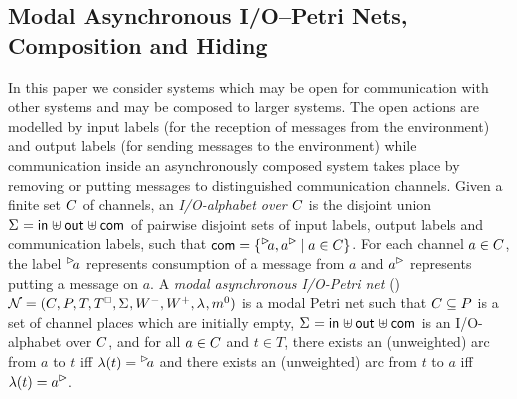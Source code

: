
\subsection{Modal Asynchronous I/O--Petri Nets, Composition and Hiding}\label{sec:MAIOPN}

In this paper we consider systems which may be open for communication with other systems and may be composed to larger systems.
The open actions are modelled by input labels (for the reception of messages from the environment) and output labels (for sending messages to the environment)
while communication inside an asynchronously composed system takes place by removing or putting messages to distinguished communication channels.
Given a finite set $C$ of channels, an \emph{I/O-alphabet over $C$} is the disjoint union $\Sigma_{} = \mathsf{in}_{} \uplus \mathsf{out}_{} \uplus \mathsf{com}_{}$ of pairwise disjoint sets of input labels, output labels and communication labels, such that $\com = \{\inact{a},\outact{a} \mid a \in \chan\}$.
For each channel $a \in C$, the label $\inact{a}$ represents consumption of a message from $a$ and $\outact{a}$ represents putting a message on $a$.
A \emph{modal asynchronous I/O-Petri net} (\MAIOPN) $\mathcal{N} = (C_{},\allowbreak P_{},\allowbreak T_{},\allowbreak T^{\scriptscriptstyle\square}_{}, \allowbreak \Sigma_{},\allowbreak W_{}^-,\allowbreak W_{}^+,\allowbreak \lambda_{},\allowbreak m^0_{})$ is a modal Petri net such that
$C \subseteq P$ is a set of channel places which are initially empty, $\Sigma_{} = \mathsf{in}_{} \uplus \mathsf{out}_{} \uplus \mathsf{com}_{}$ is an I/O-alphabet over $C$, and
for all $a \in C$ and $t \in T$, there exists an (unweighted) arc from $a$ to $t$ iff $\lambda(t) = \inact{a}$ and 
 there exists an  (unweighted) arc from $t$ to $a$ iff $\lambda(t) = \outact{a}$. 

